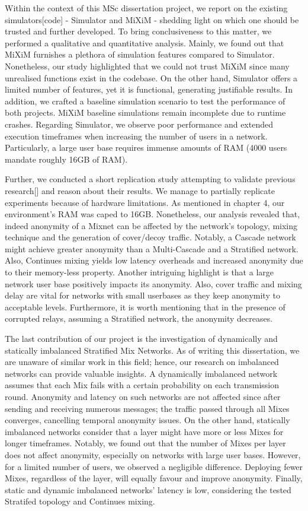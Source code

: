 \documentclass[logo,msc,cyber]{infthesis}   %
\begin{document}
Within the context of this MSc dissertation project, we report on the existing
simulators[code] - Simulator and MiXiM - shedding light on which one should be
trusted and further developed. To bring conclusiveness to this matter, we
performed a qualitative and quantitative analysis. Mainly, we found out that
MiXiM furnishes a plethora of simulation features compared to Simulator.
Nonetheless, our study highlighted that we could not trust MiXiM since many
unrealised functions exist in the codebase. On the other hand, Simulator offers
a limited number of features, yet it is functional, generating justifiable
results. In addition, we crafted a baseline simulation scenario to test the
performance of both projects. MiXiM baseline simulations remain incomplete due
to runtime crashes. Regarding Simulator, we observe poor performance and
extended execution timeframes when increasing the number of users in a network.
Particularly, a large user base requires immense amounts of RAM (4000 users
mandate roughly 16GB of RAM).

Further, we conducted a short replication study attempting to validate previous
research[] and reason about their results. We manage to partially replicate
experiments because of hardware limitations. As mentioned in chapter 4, our
environment's RAM was caped to 16GB. Nonetheless, our analysis revealed that,
indeed anonymity of a Mixnet can be affected by the network's topology, mixing
technique and the generation of cover/decoy traffic. Notably, a Cascade network
might achieve greater anonymity than a Multi-Cascade and a Stratified network.
Also, Continues mixing yields low latency overheads and increased anonymity due
to their memory-less property. Another intriguing highlight is that a large
network user base positively impacts its anonymity. Also, cover traffic and
mixing delay are vital for networks with small userbases as they keep anonymity
to acceptable levels. Furthermore, it is worth mentioning that in the presence
of corrupted relays, assuming a Stratified network, the anonymity decreases. 

The last contribution of our project is the investigation of dynamically and
statically imbalanced Stratified Mix Networks. As of writing this dissertation,
we are unaware of similar work in this field; hence, our research on imbalanced
networks can provide valuable insights. A dynamically imbalanced network assumes
that each Mix fails with a certain probability on each transmission round.
Anonymity and latency on such networks are not affected since after sending and
receiving numerous messages; the traffic passed through all Mixes converges,
cancelling temporal anonymity issues. On the other hand, statically imbalanced
networks consider that a layer might have more or less Mixes for longer
timeframes. Notably, we found out that the number of Mixes per layer does not
affect anonymity, especially on networks with large user bases. However, for a
limited number of users, we observed a negligible difference. Deploying fewer
Mixes, regardless of the layer, will equally favour and improve anonymity.
Finally, static and dynamic imbalanced networks' latency is low, considering the
tested Stratifed topology and Continues mixing.
\end{document}
